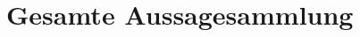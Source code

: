 \documentclass[10pt]{article}
\begin{document}
\section*{Gesamte Aussagesammlung}
\PrintEntireLibrary[filepaths=true]
\end{document}
